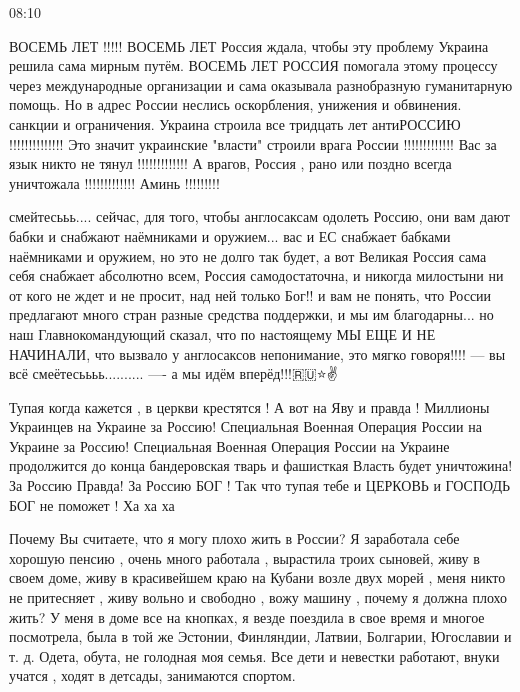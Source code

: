 08:10

ВОСЕМЬ ЛЕТ !!!!! ВОСЕМЬ ЛЕТ Россия ждала, чтобы эту проблему Украина решила
сама мирным путём. ВОСЕМЬ ЛЕТ РОССИЯ помогала этому процессу через
международные организации и сама оказывала разнобразную гуманитарную помощь. Но
в адрес России неслись оскорбления, унижения и обвинения. санкции и
ограничения. Украина строила все тридцать лет антиРОССИЮ !!!!!!!!!!!!!! Это
значит украинские "власти" строили врага России !!!!!!!!!!!!! Вас за язык никто
не тянул !!!!!!!!!!!!! А врагов, Россия , рано или поздно всегда уничтожала
!!!!!!!!!!!!! Аминь !!!!!!!!!


смейтесььь.... сейчас, для  того, чтобы англосаксам  одолеть Россию, они  вам
дают бабки и  снабжают наёмниками и  оружием...  вас  и  ЕС снабжает бабками
наёмниками и оружием, но  это не долго так будет, а вот Великая Россия сама
себя снабжает абсолютно всем, Россия самодостаточна, и никогда  милостыни ни от
кого не ждет и не просит, над ней только Бог!!  и вам не понять, что России
предлагают много стран разные средства поддержки, и мы им благодарны... но наш
Главнокомандующий сказал, что по настоящему  МЫ ЕЩЕ И НЕ НАЧИНАЛИ, что вызвало
у англосаксов  непонимание, это  мягко говоря!!!!   ---   вы всё
смеётесьььь..........  ----  а мы идём вперёд!!!🇷🇺⭐✌


Тупая когда кажется , в церкви крестятся ! А вот на Яву и правда ! Миллионы
Украинцев на Украине за Россию! Специальная Военная Операция России на Украине
за Россию! Специальная Военная Операция России на Украине продолжится до конца
бандеровская тварь и фашисткая Власть будет уничтожина! За Россию Правда! За
Россию БОГ ! Так что тупая тебе и ЦЕРКОВЬ и ГОСПОДЬ БОГ не поможет ! Ха ха ха


Почему Вы считаете, что я могу плохо жить в России? Я заработала себе хорошую
пенсию , очень много работала , вырастила троих сыновей, живу в своем доме,
живу в красивейшем краю на Кубани возле двух морей , меня никто не притесняет ,
живу вольно и свободно , вожу машину , почему я должна плохо жить? У меня в
доме все на кнопках, я везде поездила в свое время и многое посмотрела, была в
той же Эстонии, Финляндии, Латвии, Болгарии, Югославии и т. д. Одета, обута, не
голодная моя семья. Все дети и невестки работают, внуки учатся , ходят в
детсады, занимаются спортом.

